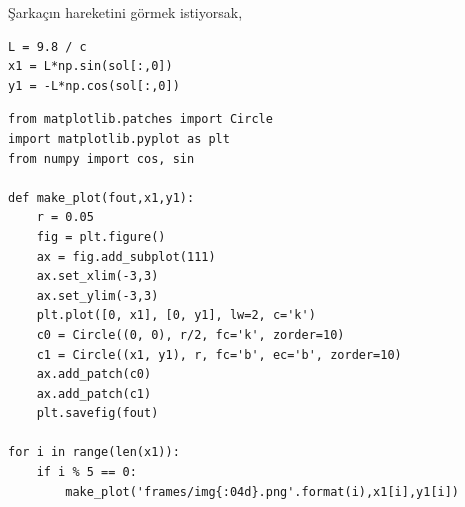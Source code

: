 \documentclass[12pt,fleqn]{article}\usepackage{../../common}
\begin{document}
Şarkaçın hareketini görmek istiyorsak,

\begin{verbatim}
L = 9.8 / c
x1 = L*np.sin(sol[:,0])
y1 = -L*np.cos(sol[:,0])
\end{verbatim}

\begin{verbatim}
from matplotlib.patches import Circle
import matplotlib.pyplot as plt
from numpy import cos, sin

def make_plot(fout,x1,y1):
    r = 0.05
    fig = plt.figure()
    ax = fig.add_subplot(111)
    ax.set_xlim(-3,3)
    ax.set_ylim(-3,3)
    plt.plot([0, x1], [0, y1], lw=2, c='k')
    c0 = Circle((0, 0), r/2, fc='k', zorder=10)
    c1 = Circle((x1, y1), r, fc='b', ec='b', zorder=10)
    ax.add_patch(c0)
    ax.add_patch(c1)
    plt.savefig(fout)

for i in range(len(x1)):
    if i % 5 == 0: 
        make_plot('frames/img{:04d}.png'.format(i),x1[i],y1[i])
\end{verbatim}
\end{document}
